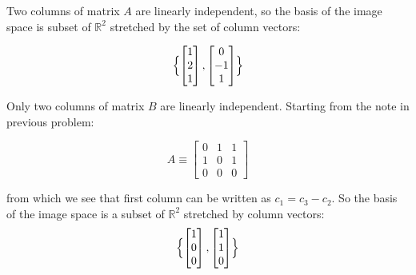 \documentclass{article}
\newcommand{\1}{\mathbf{1}}
\begin{document}
\begin{enumerate}
	Two columns of matrix $A$ are linearly independent, so the basis of the image space is subset of $\mathbb R^2$ stretched by the set of column vectors: 
	
	$$\Bigl\{   \begin{bmatrix} 1 \\ 2 \\ 1\end{bmatrix}, \begin{bmatrix} 0 \\ -1 \\ 1\end{bmatrix} \Bigr\}$$
	
	Only two columns of matrix $B$ are linearly independent. Starting from the note in previous problem:
	
	 $$A \equiv \begin{bmatrix} 0 & 1 & 1 \\ 1 & 0 & 1 \\ 0 & 0 & 0 \end{bmatrix}$$
	 
	from which we see that first column can be written as $c_1=c_3-c_2$. So the basis of the image space is a subset of $\mathbb R^2$ stretched by column vectors:
	$$\Bigl\{   \begin{bmatrix} 1 \\ 0 \\ 0\end{bmatrix}, \begin{bmatrix} 1 \\ 1 \\ 0\end{bmatrix}  \Bigr\}$$
\end{enumerate}
\end{document}
